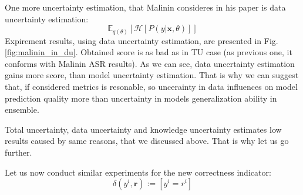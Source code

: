 \documentclass[a4paper,14pt]{extarticle}
\begin{document}
	One more uncertainty estimation, that Malinin consideres in his paper is data uncertainty estimation:
	\begin{equation*}
		\mathbb{E}_{q(\theta)}[\mathcal{H}[P(y| \textbf{x}, \theta)]]
	\end{equation*}
	Expirement results, using data uncertainty estimation, are presented in Fig. \ref{fig:malinin_in_du}. Obtained score is as bad as in TU case (as previous one, it conforms with Malinin ASR results). As we can see, data uncertainty estimation gains more score, than model uncertainty estimation. That is why we can suggest that, if considered metrics is resonable, so uncerainty in data influences on model prediction quality more than uncertainty in models generalization ability in ensemble.
	
	Total uncertainty, data uncertainty and knowledge uncertainty estimates low results caused by same reasons, that we discussed above. That is why let us go further.
	
	Let us now conduct similar experiments for the new correctness indicator:
	\begin{equation}
		\delta(y^i, \textbf{r}) := [y^i = r^i]
	\end{equation}
	
\end{document}
